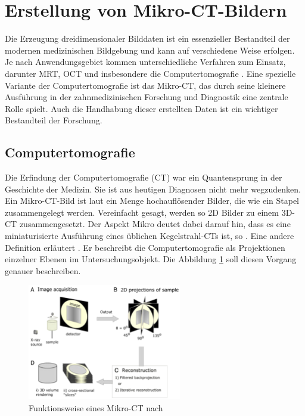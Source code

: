 \section{Erstellung von Mikro-CT-Bildern}
\label{sec:technologisch} Die Erzeugung dreidimensionaler Bilddaten ist ein
essenzieller Bestandteil der modernen medizinischen Bildgebung und kann auf
verschiedene Weise erfolgen. Je nach Anwendungsgebiet kommen unterschiedliche Verfahren
zum Einsatz, darunter \ac{MRT}, \ac{OCT} und insbesondere die Computertomografie
\citep[vgl.][S.~14]{handels2000}. Eine spezielle Variante der Computertomografie
ist das Mikro-\ac{CT}, das durch seine kleinere Ausführung in der zahnmedizinischen
Forschung und Diagnostik eine zentrale Rolle spielt. Auch die Handhabung dieser
erstellten Daten ist ein wichtiger Bestandteil der Forschung.

\subsection{Computertomografie}
\label{subsec:computertomografie} Die Erfindung der Computertomografie (\ac{CT})
war ein Quantensprung in der Geschichte der Medizin. Sie ist aus heutigen
Diagnosen nicht mehr wegzudenken. Ein Mikro-\ac{CT}-Bild ist laut \citet[S.~1]{baird2017}
ein Menge hochauflösender Bilder, die wie ein Stapel zusammengelegt werden. Vereinfacht
gesagt, werden so \ac{2D} Bilder zu einem 3D-CT zusammengesetzt. Der Aspekt
Mikro deutet dabei darauf hin, dass es eine miniaturisierte Ausführung eines üblichen
Kegelstrahl-\ac{CT}s ist, so \citet[S.~340]{buzug2011}. Eine andere Definition
erläutert \citet[S.~49]{lehmann2013bildverarbeitung}. Er beschreibt die
Computertomografie als Projektionen einzelner Ebenen im Untersuchungsobjekt. Die
Abbildung \ref{fig:spectrum} soll diesen Vorgang genauer beschreiben.

\begin{figure}[h]
	\centering
	\includegraphics[width=0.6\textwidth]{img/Funktion_CT.png}
	\caption{Funktionsweise eines Mikro-CT nach \citet[S.~16]{pult2021}}
	\label{fig:spectrum}
\end{figure}

